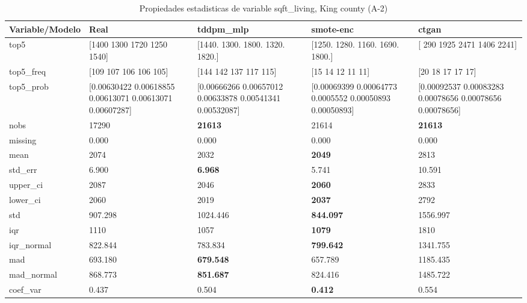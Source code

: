 \begin{table}[H]
\centering
\fontsize{8}{14}\selectfont
\caption{Propiedades  estadisticas de variable sqft\_living, King county (A-2)}
\label{table-stats-king county-a-2-sqft_living}
\begin{tabular}{|l|m{10em}|m{10em}|m{10em}|m{10em}|}
\hline
 \rowcolor[gray]{0.8}
Variable/Modelo & Real & tddpm\_mlp & smote-enc & ctgan \\
\hline top5 & [1400 1300 1720 1250 1540] & [1440. 1300. 1800. 1320. 1820.] & [1250. 1280. 1160. 1690. 1800.] & [ 290 1925 2471 1406 2241] \\
\hline top5\_freq & [109 107 106 106 105] & [144 142 137 117 115] & [15 14 12 11 11] & [20 18 17 17 17] \\
\hline top5\_prob & [0.00630422 0.00618855 0.00613071 0.00613071 0.00607287] & [0.00666266 0.00657012 0.00633878 0.00541341 0.00532087] & [0.00069399 0.00064773 0.0005552  0.00050893 0.00050893] & [0.00092537 0.00083283 0.00078656 0.00078656 0.00078656] \\
\hline nobs & 17290 & \bfseries 21613 & \cellcolor[rgb]{0.9, 0.54, 0.52} 21614 & \bfseries 21613 \\
\hline missing & 0.000 & 0.000 & 0.000 & 0.000 \\
\hline mean & 2074 & 2032 & \bfseries 2049 & \cellcolor[rgb]{0.9, 0.54, 0.52} 2813 \\
\hline std\_err & 6.900 & \bfseries 6.968 & 5.741 & \cellcolor[rgb]{0.9, 0.54, 0.52} 10.591 \\
\hline upper\_ci & 2087 & 2046 & \bfseries 2060 & \cellcolor[rgb]{0.9, 0.54, 0.52} 2833 \\
\hline lower\_ci & 2060 & 2019 & \bfseries 2037 & \cellcolor[rgb]{0.9, 0.54, 0.52} 2792 \\
\hline std & 907.298 & 1024.446 & \bfseries 844.097 & \cellcolor[rgb]{0.9, 0.54, 0.52} 1556.997 \\
\hline iqr & 1110 & 1057 & \bfseries 1079 & \cellcolor[rgb]{0.9, 0.54, 0.52} 1810 \\
\hline iqr\_normal & 822.844 & 783.834 & \bfseries 799.642 & \cellcolor[rgb]{0.9, 0.54, 0.52} 1341.755 \\
\hline mad & 693.180 & \bfseries 679.548 & 657.789 & \cellcolor[rgb]{0.9, 0.54, 0.52} 1185.435 \\
\hline mad\_normal & 868.773 & \bfseries 851.687 & 824.416 & \cellcolor[rgb]{0.9, 0.54, 0.52} 1485.722 \\
\hline coef\_var & 0.437 & 0.504 & \bfseries 0.412 & \cellcolor[rgb]{0.9, 0.54, 0.52} 0.554 \\

\end{tabular}
\end{table}
